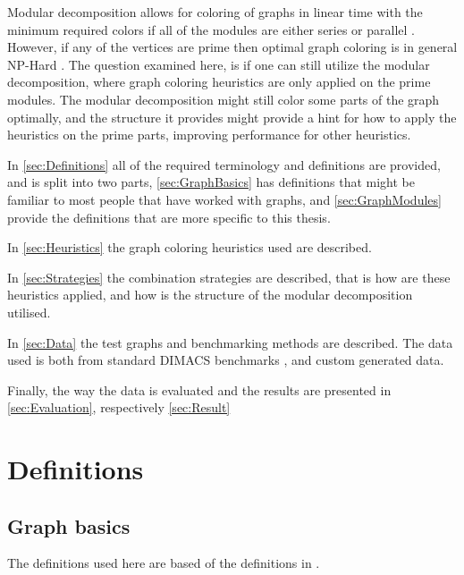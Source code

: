 \documentclass[a4paper]{article}
\begin{document}
Modular decomposition allows for coloring of graphs in linear time with the
minimum required colors if all of the modules are either  series or parallel
\cite{HCL}. However, if any of the vertices are prime then optimal graph
coloring is in general NP-Hard \cite{NPHard}. The question examined here, is if
one can still utilize the modular decomposition, where graph coloring
heuristics are only applied on the prime modules. The modular decomposition
might still color some parts of the graph optimally, and the structure it
provides might provide a hint for how to apply the heuristics on the prime
parts, improving performance for other heuristics.

In \autoref{sec:Definitions} all of the required terminology and definitions are
provided, and is split into two parts, \autoref{sec:GraphBasics} has definitions that might be
familiar to most people that have worked with graphs, and
\autoref{sec:GraphModules} provide the definitions that are more specific to
this thesis.

In \autoref{sec:Heuristics} the graph coloring heuristics used are described.

In \autoref{sec:Strategies} the combination strategies are described, that is how are
these heuristics applied, and how is the structure of the modular decomposition
utilised.

In \autoref{sec:Data} the test graphs and benchmarking methods are described. The data
used is both from standard DIMACS benchmarks \cite{DIMACS}, and custom generated data.

Finally, the way the data is evaluated and the results are presented in 
\autoref{sec:Evaluation}, respectively \autoref{sec:Result}

\section{Definitions}
\label{sec:Definitions}

\subsection{Graph basics}
\label{sec:GraphBasics}

The definitions used here are based of the definitions in \cite{GraphBasics}. 
\end{document}
